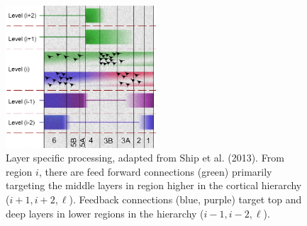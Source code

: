 \begin{figure}[!ht]
	\centering
	\includegraphics[width=0.5\textwidth, clip=true]{./Chapters/01_Introduction/Images/LaminarProcessing}
	\caption{Layer specific processing, adapted from Ship et al. (2013)\cite{Shipp2013}. From region $i$, there are feed forward connections (green) primarily targeting the middle layers in region higher in the cortical hierarchy ($i+1, i+2, \ell$). Feedback connections (blue, purple) target top and deep layers in lower regions in the hierarchy ($i-1, i-2, \ell$).}
	\label{fig:layerprocessing}
\end{figure}
